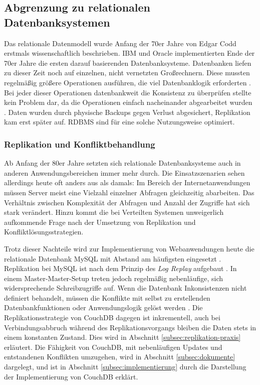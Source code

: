 \subsection{Abgrenzung zu relationalen Datenbanksystemen}


Das relationale Datenmodell wurde Anfang der 70er Jahre von Edgar Codd  erstmals wissenschaftlich beschrieben. IBM und Oracle implementierten Ende der 70er Jahre die ersten darauf basierenden Datenbanksysteme. Datenbanken liefen zu dieser Zeit noch auf einzelnen, nicht vernetzten Großrechnern. Diese mussten regelmäßig größere Operationen ausführen, die viel Datenbanklogik erforderten . Bei jeder dieser Operationen datenbankweit die Konsistenz zu überprüfen stellte kein Problem dar, da die Operationen einfach nacheinander abgearbeitet wurden . Daten wurden durch physische Backups gegen Verlust abgesichert, Replikation kam erst später auf. RDBMS sind für eine solche Nutzungsweise optimiert. 


\subsubsection{Replikation und Konfliktbehandlung}

Ab Anfang der 80er Jahre setzten sich relationale Datenbanksysteme auch in anderen Anwendungsbereichen immer mehr durch. Die Einsatzszenarien sehen allerdings heute oft anders aus als damals: Im Bereich der Internetanwendungen müssen Server meist eine Vielzahl einzelner Abfragen gleichzeitig abarbeiten. Das Verhältnis zwischen Komplexität der Abfragen und Anzahl der Zugriffe hat sich stark verändert. Hinzu kommt die bei Verteilten Systemen unweigerlich aufkommende Frage nach der Umsetzung von Replikation und Konfliktlösungsstrategien.

Trotz dieser Nachteile wird zur Implementierung von Webanwendungen heute die relationale Datenbank MySQL \cite{mysql:website} mit Abstand am häufigsten eingesetzt \cite[S. 18]{os:barometer}. Replikation bei MySQL ist nach dem Prinzip des \textit{Log Replay} aufgebaut \cite{mysql:replication}. In einem Master-Master-Setup treten jedoch regelmäßig nebenläufige, sich widersprechende Schreibzugriffe auf. Wenn die Datenbank Inkonsistenzen nicht definiert behandelt, müssen die Konflikte mit selbst zu erstellenden Datenbankfunktionen oder Anwendungslogik gelöst werden \cite{mysql:multimaster}. Die Replikationsstrategie von CouchDB dagegen ist inkrementell, auch bei Verbindungsabbruch während des Replikationsvorgangs bleiben die Daten stets in einem konstanten Zustand. Dies wird in Abschnitt \ref{subsec:replikation-praxis} erläutert. Die Fähigkeit von CouchDB, mit nebenläufigen Updates und entstandenen Konflikten umzugehen, wird in Abschnitt \ref{subsec:dokumente} dargelegt, und ist in Abschnitt \ref{subsec:implementierung} durch die Darstellung der Implementierung von CouchDB erklärt.



